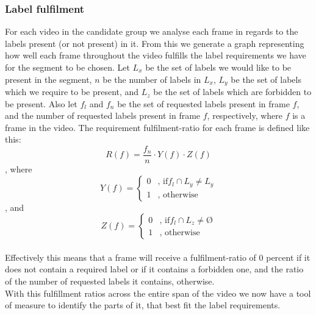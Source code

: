 \subsubsection{Label fulfilment}
%
For each video in the candidate group we analyse each frame in regards to the labels present (or not present) in it. From this we generate a graph representing how well each frame throughout the video fulfills the label requirements we have for the segment to be chosen. Let $L_{x}$ be the set of labels we would like to be present in the segment, $n$ be the number of labels in $L_{x}$, $L_{y}$ be the set of labels which we require to be present, and $L_{z}$ be the set of labels which are forbidden to be present. Also let $f_{l}$ and $f_{n}$ be the set of requested labels present in frame $f$, and the number of requested labels present in frame $f$, respectively, where $f$ is a frame in the video. The requirement fulfilment-ratio for each frame is defined like this:\\
%
\begin{equation}
R(f) = \frac{f_{n}}{n} \cdot Y(f) \cdot Z(f)
\end{equation} 
%
, where\\
%
\begin{equation}
Y(f) =
\begin{cases}
0 & \text{, if} f_{l} \cap L_{y} \neq L_{y}\\
1 &  \text{, otherwise}
\end{cases}
\end{equation} 
%
, and\\
%
\begin{equation}
Z(f) =
\begin{cases}
0 & \text{, if} f_{l} \cap L_{z} \neq Ø\\
1 &  \text{, otherwise}
\end{cases}
\end{equation} 
%
\\
%
Effectively this means that a frame will receive a fulfilment-ratio of 0 percent if it does not contain a required label or if it contains a forbidden one, and the ratio of the number of requested labels it contains, otherwise.\\
%
With this fulfillment ratios across the entire span of the video we now have a tool of measure to identify the parts of it, that best fit the label requirements.
%
